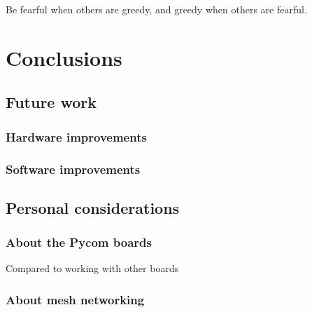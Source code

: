 
\begin{savequote}[70mm]
	Be fearful when others are greedy, and greedy when others are fearful.
\end{savequote}

\chapter{Conclusions}\label{ch:conclusions}

	\section{Future work}
	
		\subsection{Hardware improvements}
			

		\subsection{Software improvements}

	\section{Personal considerations}
	
		\subsection{About the Pycom boards}
		
			Compared to working with other boards
			
		\subsection{About mesh networking}

